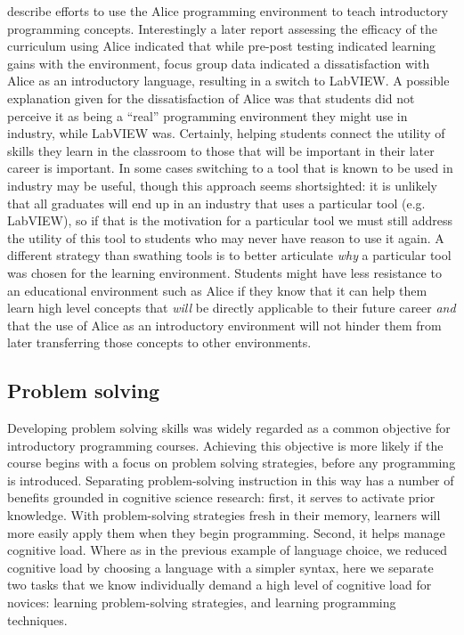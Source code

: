 \documentclass[12pt]{article}
\begin{document}
\citeauthor{snook_incorporation_2005} describe efforts to use the Alice
programming environment to teach introductory programming
concepts\autocite{snook_incorporation_2005}. Interestingly a later
report assessing the efficacy of the curriculum using Alice indicated
that while pre-post testing indicated learning gains with the
environment, focus group data indicated a dissatisfaction with Alice
as an introductory language, resulting in a switch to
LabVIEW\autocite{lohani_reformulating_2011}. A possible explanation
given for the dissatisfaction of Alice was that students did not
perceive it as being a ``real'' programming environment they might use
in industry, while LabVIEW was. Certainly, helping students connect
the utility of skills they learn in the classroom to those that will
be important in their later career is important. In some cases
switching to a tool that is known to be used in industry may be
useful, though this approach seems shortsighted: it is unlikely that
all graduates will end up in an industry that uses a particular tool
(e.g. LabVIEW), so if that is the motivation for a particular tool we
must still address the utility of this tool to students who may never
have reason to use it again. A different strategy than swathing tools
is to better articulate \emph{why} a particular tool was chosen for
the learning environment. Students might have less resistance to an
educational environment such as Alice if they know that it can help
them learn high level concepts that \emph{will} be directly applicable
to their future career \emph{and} that the use of Alice as an
introductory environment will not hinder them from later transferring
those concepts to other environments.

\subsection*{Problem solving}
Developing problem solving skills was widely regarded as a common objective
for introductory programming courses. Achieving this objective is more
likely if the course begins with a focus on problem solving
strategies, before any programming is
introduced\autocite{koulouri_teaching_2014}. Separating
problem-solving instruction in this way has a number of benefits
grounded in cognitive science research: first, it serves to activate
prior knowledge\autocite{ambrose_how_2010}. With problem-solving
strategies fresh in their memory, learners will more easily apply them
when they begin programming. Second, it helps manage cognitive
load. Where as in the previous example of language choice, we reduced
cognitive load by choosing a language with a simpler syntax, here we
separate two tasks that we know individually demand a high level of
cognitive load for novices: learning problem-solving strategies, and
learning programming techniques.
\end{document}
